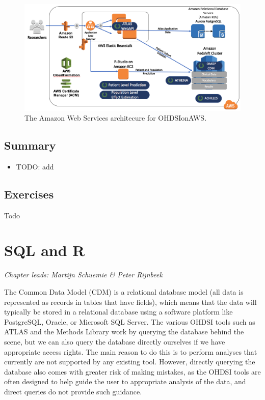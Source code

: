 \documentclass[11pt]{book}
\providecommand{\tightlist}{%
  \setlength{\itemsep}{0pt}\setlength{\parskip}{0pt}}
\theoremstyle{definition}
\theoremstyle{definition}
\theoremstyle{definition}
\theoremstyle{remark}
\let\BeginKnitrBlock\begin \let\EndKnitrBlock\end
\begin{document}
\begin{figure}

{\centering \includegraphics[width=1\linewidth]{images/OhdsiAnalyticsTools/OHDSIonAWSDiagram} 

}

\caption{The Amazon Web Services architecure for OHDSIonAWS.}\label{fig:ohdsionawsDiagram}
\end{figure}

\hypertarget{summary-3}{%
\section{Summary}\label{summary-3}}

\BeginKnitrBlock{rmdsummary}
\begin{itemize}
\tightlist
\item
  TODO: add
\end{itemize}
\EndKnitrBlock{rmdsummary}

\hypertarget{exercises-1}{%
\section{Exercises}\label{exercises-1}}

Todo

\hypertarget{SqlAndR}{%
\chapter{SQL and R}\label{SqlAndR}}

\emph{Chapter leads: Martijn Schuemie \& Peter Rijnbeek}

The Common Data Model (CDM) is a relational database model (all data is represented as records in tables that have fields), which means that the data will typically be stored in a relational database using a software platform like PostgreSQL, Oracle, or Microsoft SQL Server. The various OHDSI tools such as ATLAS and the Methods Library work by querying the database behind the scene, but we can also query the database directly ourselves if we have appropriate access rights. The main reason to do this is to perform analyses that currently are not supported by any existing tool. However, directly querying the database also comes with greater risk of making mistakes, as the OHDSI tools are often designed to help guide the user to appropriate analysis of the data, and direct queries do not provide such guidance.
\end{document}
